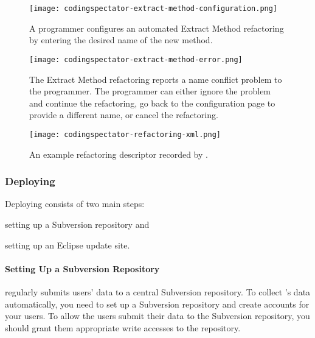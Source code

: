 \begin{figure}
%
\centering
%
\texttt{[image: codingspectator-extract-method-configuration.png]}
%
\caption{\label{FigCodingSpectatorExtractMethodConfigurationExample}A programmer
configures an automated Extract Method refactoring by entering the desired name
of the new method.}
%
\end{figure}

\begin{figure}
%
\centering
%
\texttt{[image: codingspectator-extract-method-error.png]}
%
\caption{\label{FigCodingSpectatorExtractMethodErrorExample}The Extract Method
refactoring reports a name conflict problem to the programmer. The programmer
can either ignore the problem and continue the refactoring, go back to the
configuration page to provide a different name, or cancel the refactoring.}
%
\end{figure}

\begin{figure}
%
\centering
%
\texttt{[image: codingspectator-refactoring-xml.png]}
%
\caption{\label{FigCodingSpectatorDescriptorExample}An example refactoring
descriptor recorded by \CodingSpectator.}
%
\end{figure}

\subsubsection{Deploying \CodingSpectator}

Deploying \CodingSpectator{} consists of two main steps:
%
\begin{inparaenum}[(1)]
%
\item setting up a Subversion repository and
%
\item setting up an Eclipse update site.
%
\end{inparaenum}

\paragraph{Setting Up a Subversion Repository}

\CodingSpectator{} regularly submits users' data to a central Subversion
repository. To collect \CodingSpectator's data automatically, you need to set up
a Subversion repository and create accounts for your users. To allow the users
submit their data to the Subversion repository, you should grant them
appropriate write accesses to the repository.

